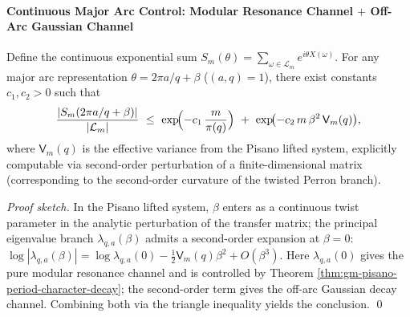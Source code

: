 \paragraph{Continuous Major Arc Control: Modular Resonance Channel \texorpdfstring{$+$}{+} Off-Arc Gaussian Channel}
\begin{proposition}\label{prop:gm-continuous-major-arc-control}
Define the continuous exponential sum \(S_m(\theta)=\sum_{\omega\in\mathcal{L}_m}e^{i\theta X(\omega)}\).
For any major arc representation \(\theta=2\pi a/q+\beta\) (\((a,q)=1\)), there exist constants \(c_1,c_2>0\) such that
\[
\frac{|S_m(2\pi a/q+\beta)|}{|\mathcal{L}_m|}
\ \le\
\exp\!\Bigl(-c_1\,\frac{m}{\pi(q)}\Bigr)
\ +\
\exp\!\bigl(-c_2\,m\,\beta^2\,\mathsf{V}_m(q)\bigr),
\]
where \(\mathsf{V}_m(q)\) is the effective variance from the Pisano lifted system, explicitly computable via second-order perturbation of a finite-dimensional matrix (corresponding to the second-order curvature of the twisted Perron branch).
\end{proposition}

\begin{proof}[Proof sketch]
In the Pisano lifted system, \(\beta\) enters as a continuous twist parameter in the analytic perturbation of the transfer matrix; the principal eigenvalue branch \(\lambda_{q,a}(\beta)\) admits a second-order expansion at \(\beta=0\):
\(
\log|\lambda_{q,a}(\beta)|=\log\lambda_{q,a}(0)-\tfrac12\mathsf{V}_m(q)\beta^2+O(\beta^3)
\).
Here \(\lambda_{q,a}(0)\) gives the pure modular resonance channel and is controlled by Theorem \ref{thm:gm-pisano-period-character-decay}; the second-order term gives the off-arc Gaussian decay channel.
Combining both via the triangle inequality yields the conclusion. \qed
\end{proof}

